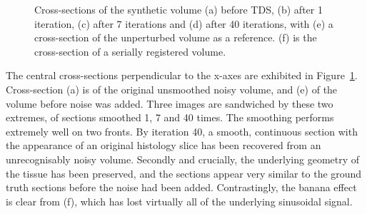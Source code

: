 \begin{figure}[!t]
    \caption{Cross-sections of the synthetic volume (a) before TDS, (b) after 1 iteration, (c) after 7 iterations and (d) after 40 iterations, with (e) a cross-section of the unperturbed volume as a reference. (f) is the cross-section of a serially registered volume.}
    \label{fig:synthetic_cross_sections}
  \end{figure}
  The central cross-sections perpendicular to the x-axes are exhibited in Figure~\ref{fig:synthetic_cross_sections}. Cross-section (a) is of the original unsmoothed noisy volume, and (e) of the volume before noise was added. Three images are sandwiched by these two extremes, of sections smoothed 1, 7 and 40 times. The smoothing performs extremely well on two fronts. By iteration 40, a smooth, continuous section with the appearance of an original histology slice has been recovered from an unrecognisably noisy volume. Secondly and crucially, the underlying geometry of the tissue has been preserved, and the sections appear very similar to the ground truth sections before the noise had been added. Contrastingly, the banana effect is clear from (f), which has lost virtually all of the underlying sinusoidal signal.
  
